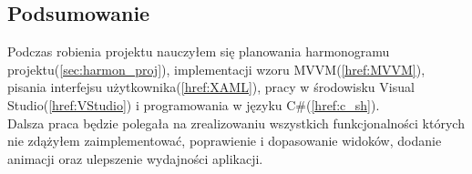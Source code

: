 \begin{flushleft}
\section{\LARGE{Podsumowanie}}
\end{flushleft}

\begin{flushleft}
    \hspace{5mm}Podczas robienia projektu nauczyłem się planowania harmonogramu projektu(\ref{sec:harmon_proj}), implementacji wzoru MVVM(\ref{href:MVVM}), pisania interfejsu użytkownika(\ref{href:XAML}), pracy w środowisku Visual Studio(\ref{href:VStudio}) i programowania w języku C\#(\ref{href:c_sh}).
    \\
    \hspace{5mm}Dalsza praca będzie polegała na zrealizowaniu wszystkich funkcjonalności których nie zdążyłem zaimplementować, poprawienie i dopasowanie widoków, dodanie animacji oraz ulepszenie wydajności aplikacji.
\end{flushleft}

